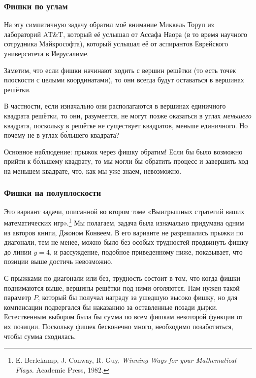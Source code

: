 \subsubsection*{Фишки по углам}%

На эту симпатичную задачу обратил моё внимание Миккель Торуп из лабораторий AT\&T, %
который её услышал от Ассафа Наора %
(в то время научного сотрудника Майкрософта), который услышал её от аспирантов Еврейского университета в Иерусалиме.

\medskip

Заметим, что если фишки начинают ходить с вершин решётки (то есть точек плоскости с целыми координатами), то они всегда будут оставаться в вершинах решётки.

В частности, если изначально они располагаются в вершинах единичного квадрата решётки, то они, разумеется, не могут позже оказаться в углах \emph{меньшего} квадрата, поскольку в решётке не существует квадратов, меньше единичного.
Но почему не в углах б\'{о}льшего квадрата?

Основное наблюдение: прыжок через фишку обратим!
Если бы было возможно прийти к б\'{о}льшему квадрату, то мы могли бы обратить процесс и завершить ход на меньшем квадрате, что, как мы уже знаем, невозможно.
\heart

\subsubsection*{Фишки на полуплоскости}%

Это вариант задачи, описанной во втором томе «Выигрышных стратегий ваших математических игр».\footnote{E. Berlekamp, J. Conway, R. Guy,
\emph{Winning Ways for your Mathematical Plays.} Academic Press, 1982.}
Мы полагаем, задача была изначально придумана одним из авторов книги, Джоном Конвеем.
В его варианте не разрешались прыжки по диагонали, тем не менее, можно было без особых трудностей продвинуть фишку до линии $y = 4$, и рассуждение, подобное приведенному ниже, показывает, что позиции выше достичь невозможно.

С прыжками по диагонали или без, трудность состоит в том, что когда фишки поднимаются выше, вершины решётки под ними оголяются.
Нам нужен такой параметр $P$, который бы получал награду за ушедшую высоко фишку, но для компенсации подвергался бы наказанию за оставленные позади дырки.
Естественным выбором была бы сумма по всем фишкам некоторой функции от их позиции.
Поскольку фишек бесконечно много, необходимо позаботиться, чтобы сумма сходилась.

